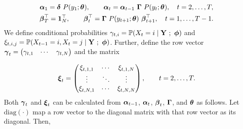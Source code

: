 \begin{gather}
    \boldsymbol{\alpha}_1 = \boldsymbol{\delta} ~ P(y_1;\boldsymbol{\theta}), \qquad 
    \boldsymbol{\alpha}_t = \boldsymbol{\alpha}_{t-1} ~ \boldsymbol{\Gamma} ~ P(y_t;\boldsymbol{\theta}), \quad t = 2,\ldots,T, \label{eqn:alpha} \\
    \boldsymbol{\beta}^\top_T = \mathbf{1}_N^\top, \qquad
    \boldsymbol{\beta}^\top_t = \boldsymbol{\Gamma} ~ P(y_{t+1};\boldsymbol{\theta}) ~ \boldsymbol{\beta}^\top_{t+1}, \quad t = 1,\ldots,T-1. \label{eqn:beta}
\end{gather}
%
We define conditional probabilities $\gamma_{t,i} = \mathbb{P}(X_t = i \mid \mathbf{Y} ~;~ \boldsymbol{\phi})$ and $\xi_{t,i,j} = \mathbb{P}(X_{t-1} = i, X_t = j \mid \mathbf{Y} ~;~ \boldsymbol{\phi})$.
%
%
Further, define the row vector $\boldsymbol{\gamma}_t = \begin{pmatrix} \gamma_{t,1} & \cdots & \gamma_{t,N} \end{pmatrix}$ and the matrix 

\begin{equation*}
    \boldsymbol{\xi}_t = \begin{pmatrix} 
    \xi_{t,1,1} & \cdots & \xi_{t,1,N} \\
    \vdots & \ddots & \vdots \\
    \xi_{t,N,1} & \cdots & \xi_{t,N,N} \\
    \end{pmatrix}, \qquad t = 2,\ldots,T. 
\end{equation*}
%
Both $\boldsymbol{\gamma}_t$ and $\boldsymbol{\xi}_t$ can be calculated from $\boldsymbol{\alpha}_{t-1}$, $\boldsymbol{\alpha}_t$, $\boldsymbol{\beta}_t$, $\boldsymbol{\Gamma}$, and $\boldsymbol{\theta}$ as follows. Let $\text{diag}(\cdot)$ map a row vector to the diagonal matrix with that row vector as its diagonal. Then,

